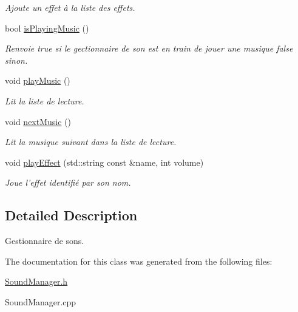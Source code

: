 \begin{DoxyCompactItemize}
\begin{DoxyCompactList}\small\item\em Ajoute un effet à la liste des effets. \end{DoxyCompactList}\item 
\hypertarget{classSoundManager_a43c79a5278a1c423a463eda0c80b8c11}{bool \hyperlink{classSoundManager_a43c79a5278a1c423a463eda0c80b8c11}{is\+Playing\+Music} ()}\label{classSoundManager_a43c79a5278a1c423a463eda0c80b8c11}

\begin{DoxyCompactList}\small\item\em Renvoie true si le gectionnaire de son est en train de jouer une musique false sinon. \end{DoxyCompactList}\item 
\hypertarget{classSoundManager_a22b283e46295d90a28b97df7923f2999}{void \hyperlink{classSoundManager_a22b283e46295d90a28b97df7923f2999}{play\+Music} ()}\label{classSoundManager_a22b283e46295d90a28b97df7923f2999}

\begin{DoxyCompactList}\small\item\em Lit la liste de lecture. \end{DoxyCompactList}\item 
\hypertarget{classSoundManager_aa78ebda8e0a1a06b87d405eda32fa21a}{void \hyperlink{classSoundManager_aa78ebda8e0a1a06b87d405eda32fa21a}{next\+Music} ()}\label{classSoundManager_aa78ebda8e0a1a06b87d405eda32fa21a}

\begin{DoxyCompactList}\small\item\em Lit la musique suivant dans la liste de lecture. \end{DoxyCompactList}\item 
\hypertarget{classSoundManager_a5ae512c899d6cf2e818a0c12e7f74b06}{void \hyperlink{classSoundManager_a5ae512c899d6cf2e818a0c12e7f74b06}{play\+Effect} (std\+::string const \&name, int volume)}\label{classSoundManager_a5ae512c899d6cf2e818a0c12e7f74b06}

\begin{DoxyCompactList}\small\item\em Joue l'effet identifié par son nom. \end{DoxyCompactList}\end{DoxyCompactItemize}


\subsection{Detailed Description}
Gestionnaire de sons. 

The documentation for this class was generated from the following files\+:\begin{DoxyCompactItemize}
\item 
\hyperlink{SoundManager_8h}{Sound\+Manager.\+h}\item 
Sound\+Manager.\+cpp\end{DoxyCompactItemize}
